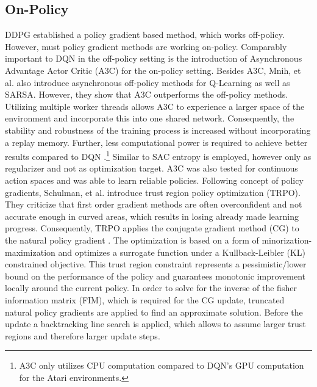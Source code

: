     \subsection{On-Policy}
    \label{sec:on-policy}
   	DDPG established a policy gradient based method, which works off-policy. 
   	However, must policy gradient methods are working on-policy.
	Comparably important to DQN \cite{Mnih2015} in the off-policy setting is the introduction of Asynchronous Advantage Actor Critic (A3C) \cite{Mnih2016} for the on-policy setting.
   	Besides A3C, Mnih, et al. also introduce asynchronous off-policy methods for Q-Learning as well as SARSA.
   	However, they show that A3C outperforms the off-policy methods.
   	Utilizing multiple worker threads allows A3C to experience a larger space of the environment and incorporate this into one shared network.
   	Consequently, the stability and robustness of the training process is increased without incorporating a replay memory. 
	Further, less computational power is required to achieve better results compared to DQN \cite{Mnih2015}.\footnote{A3C only utilizes CPU computation compared to DQN's GPU computation for the Atari environments.}
	Similar to SAC \cite{Haarnoja2018} entropy is employed, however only as regularizer and not as optimization target.
	A3C was also tested for continuous action spaces and was able to learn reliable policies. 
    Following concept of policy gradients, Schulman, et al. \cite{Schulman2015} introduce trust region policy optimization (TRPO).
    They criticize that first order gradient methods are often overconfident and not accurate enough in curved areas, which results in losing already made learning progress. 
    Consequently, TRPO applies the conjugate gradient method (CG) to the natural policy gradient \cite{Kakade2001}.
    The optimization is based on a form of minorization-maximization \cite{Hunter2004} and optimizes a surrogate function under a Kullback-Leibler (KL) constrained objective.
    This trust region constraint represents a pessimistic/lower bound on the performance of the policy and guarantees monotonic improvement locally around the current policy.	
    In order to solve for the inverse of the fisher information matrix (FIM), which is required for the CG update, truncated natural policy gradients are applied to find an approximate solution. 
    Before the update a backtracking line search is applied, which allows to assume larger trust regions and therefore larger update steps. 
